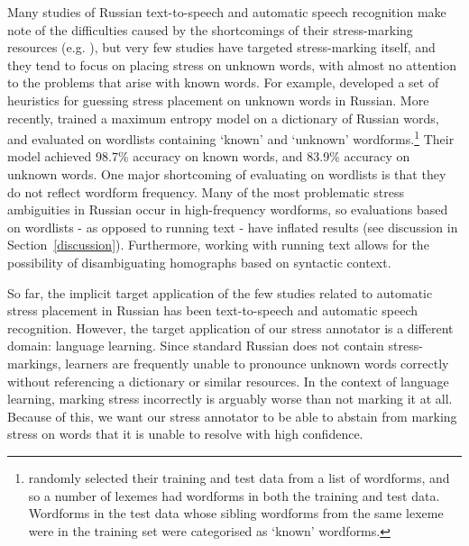 \documentclass[11pt]{article}
\begin{document}
Many studies of Russian text-to-speech and automatic speech recognition make note of the 
difficulties caused by the shortcomings of their stress-marking resources (e.g. \cite{krivnova_1998}), but very few studies have targeted stress-marking itself, and they tend to
focus on placing stress on unknown words, with almost no attention to the problems that
arise with known words. For example, 
\cite{Xomicevic_2008} developed a set of heuristics for guessing stress placement on 
unknown words in Russian. More recently, \cite{hall_sproat_russian_2013} trained 
a maximum entropy model on a dictionary of Russian words, and evaluated on
wordlists containing `known' and `unknown' wordforms.\footnote{ randomly selected their training
and test data from a list of wordforms, and so a number of lexemes had wordforms in both the training and test data. Wordforms in the test data whose sibling wordforms from the same lexeme were in the training set were categorised as 
`known' wordforms.} Their model 
achieved 98.7\% accuracy on known words, and 83.9\% accuracy on unknown words. 
One major shortcoming of evaluating on wordlists is 
that they do not reflect wordform frequency.
Many of the most problematic stress ambiguities in Russian occur in 
high-frequency wordforms, so evaluations based on wordlists - as opposed to 
running text - have inflated results (see discussion in 
Section~\ref{discussion}). Furthermore, working with running text allows for the
possibility of disambiguating homographs based on syntactic context.

So far, the implicit target application of the few studies related to automatic 
stress placement in Russian has been text-to-speech and automatic speech 
recognition. However, the target application of our stress
annotator is a different domain: language learning. Since standard Russian does 
not contain stress-markings, learners are frequently unable to pronounce unknown 
words correctly without referencing a dictionary or similar resources. In the 
context of language learning, marking stress incorrectly is arguably worse than 
not marking it at all. Because of this, we want our stress annotator to be able 
to abstain from marking stress on words that it is unable to resolve with high 
confidence.
\end{document}
